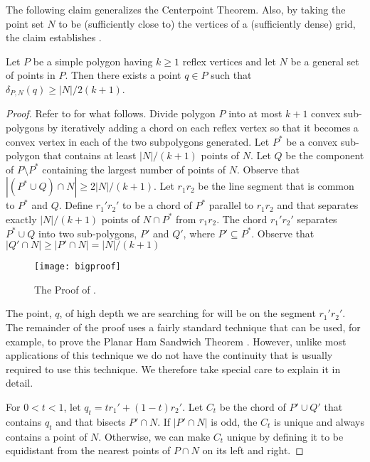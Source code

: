 \documentclass{article}
\begin{document}
The following claim generalizes the Centerpoint Theorem.  Also, by
taking the point set $N$ to be (sufficiently close to) the vertices of
a (sufficiently dense) grid, the claim establishes
. 

\begin{clm} 
Let $P$ be a simple polygon having $k\ge 1$ reflex vertices and let
$N$ be a general set of points in $P$.  Then there exists a point
$q\in P$ such that $\delta_{P,N}(q) \ge |N|/2(k+1)$.
\end{clm}
\begin{proof}
Refer to  for what follows.  
Divide polygon $P$ into at most $k+1$ convex sub-polygons by
iteratively adding a chord on each reflex vertex so that it becomes a
convex vertex in each of the two subpolygons generated.  Let $P^*$ be
a convex sub-polygon that contains at least $|N|/(k+1)$ points of $N$.
Let $Q$ be the component of $P\setminus P^*$ containing the largest
number of points of $N$.  Observe that $|(P^*\cup Q)\cap N|\ge
2|N|/(k+1)$.  Let $r_1r_2$ be the line segment that is common to
$P^*$ and $Q$.  Define $r_1'r_2'$ to be a chord of $P^*$ parallel to
$r_1r_2$ and that separates exactly $|N|/(k+1)$ points of
$N\cap P^*$ from $r_1r_2$. 
The chord $r_1'r_2'$ separates $P^*\cup Q$
into two sub-polygons, $P'$ and $Q'$, where $P'\subseteq P^*$.
Observe that $|Q'\cap N|\ge |P'\cap N| = |N|/(k+1)$

\begin{figure}
  \begin{center}
    \texttt{[image: bigproof]}
  \end{center}
  \caption{The Proof of .}
\end{figure}

The point, $q$, of high depth we are searching for will be on the
segment $r_1'r_2'$. The remainder of the proof uses a fairly standard
technique that can be used, for example, to prove the Planar Ham
Sandwich Theorem \cite{m03}. However, unlike most applications of this
technique we do not have the continuity that is usually required to
use this technique.  We therefore take special care to explain it in
detail.
 
For $0< t< 1$, let $q_t = tr_1'+(1-t)r_2'$.  Let $C_t$ be the chord of
$P'\cup Q'$ that contains $q_t$ and that bisects $P'\cap N$.  If
$|P'\cap N|$ is odd, the $C_t$ is unique and always contains a point
of $N$.  Otherwise, we can make $C_t$ unique by defining it to be
equidistant from the nearest points of $P\cap N$ on its left and
right.


\end{proof}
\end{document}
